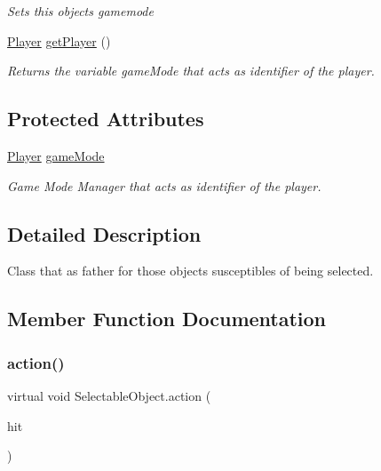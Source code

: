 \begin{DoxyCompactItemize}
\begin{DoxyCompactList}\small\item\em Sets this objects gamemode \end{DoxyCompactList}\item 
\mbox{\hyperlink{class_player}{Player}} \mbox{\hyperlink{class_selectable_object_a143b593a577ffb7de1edd530c677c9e6}{get\+Player}} ()
\begin{DoxyCompactList}\small\item\em Returns the variable game\+Mode that acts as identifier of the player. \end{DoxyCompactList}\end{DoxyCompactItemize}
\subsection*{Protected Attributes}
\begin{DoxyCompactItemize}
\item 
\mbox{\hyperlink{class_player}{Player}} \mbox{\hyperlink{class_selectable_object_ae127d54f7f6ac4f1655b1fa3f4dd480f}{game\+Mode}}
\begin{DoxyCompactList}\small\item\em Game Mode Manager that acts as identifier of the player. \end{DoxyCompactList}\end{DoxyCompactItemize}


\subsection{Detailed Description}
Class that as father for those objects susceptibles of being selected. 



\subsection{Member Function Documentation}
\mbox{\label{class_selectable_object_adb08e08703832f624d9bf62fc02208a8}} 
\subsubsection{\texorpdfstring{action()}{action()}}
{\footnotesize\ttfamily virtual void Selectable\+Object.\+action (\begin{DoxyParamCaption}\item[{Raycast\+Hit}]{hit }\end{DoxyParamCaption})\hspace{0.3cm}{\ttfamily [virtual]}}



